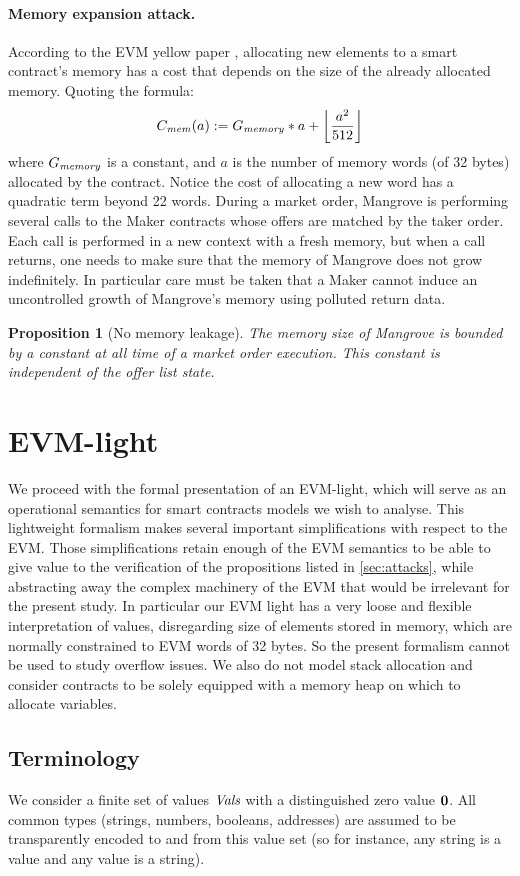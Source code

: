\documentclass[12pt]{extarticle}
\newtheorem{proposition}{Proposition}
\begin{document}
\paragraph{Memory expansion attack.}
According to the EVM yellow paper \cite{Ethereum}, allocating new elements to a smart contract's memory has a cost that depends on the size of the already allocated memory. Quoting the formula:
$$
C_{\it mem}(a) := G_{\it memory}*a+\left\lfloor\dfrac{a^2}{512}\right\rfloor
$$
where $G_{\it memory}$ is a constant, and $a$ is the number of memory words (of 32 bytes) allocated by the contract. Notice the cost of allocating a new word has a quadratic term beyond 22 words. During a market order, Mangrove is performing several calls to the Maker contracts whose offers are matched by the taker order. Each call is performed in a new context with a fresh memory, but when a call returns, one needs to make sure that the memory of Mangrove does not grow indefinitely. In particular care must be taken that a Maker cannot induce an uncontrolled growth of Mangrove's memory using polluted return data. 

\begin{proposition}[No memory leakage]
The memory size of Mangrove is bounded by a constant at all time of a market order execution. This constant is independent of the offer list state.
\end{proposition}

\section{EVM-light}
We proceed with the formal presentation of an EVM-light, which will serve as an operational semantics for smart contracts models we wish to analyse. This lightweight formalism makes several important simplifications with respect to the EVM. Those simplifications retain enough of the EVM semantics to be able to give value to the verification of the propositions listed in \autoref{sec:attacks}, while abstracting away the complex machinery of the EVM that would be irrelevant for the present study. In particular our EVM light has a very loose and flexible interpretation of values, disregarding size of elements stored in memory, which are normally constrained to EVM words of 32 bytes. So the present formalism cannot be used to study overflow issues. We also do not model stack allocation and consider contracts to be solely equipped with a memory heap on which to allocate variables. 


\subsection{Terminology}
We consider a finite set of values $\textit{Vals}$ with a distinguished zero value $\mathbf{0}$. All common types (strings, numbers, booleans, addresses) are assumed to be transparently encoded to and from this value set (so for instance, any string is a value and any value is a string).
\end{document}
